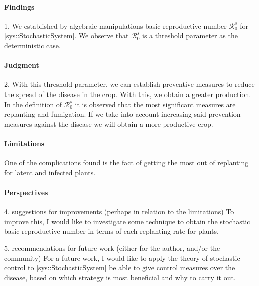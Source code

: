 \paragraph{Findings}
1. We established by algebraic manipulations basic reproductive number
$\mathcal{R}^s_0$ for \autoref{sys::StochasticSystem}. We observe that
$\mathcal{R}^s_0$ is a threshold parameter as the deterministic case.
\paragraph{Judgment}
2. With this threshold parameter, we can establish preventive measures to reduce
the spread of the disease in the crop. With this, we obtain a greater production.
In the definition of $\mathcal{R}^s_0$ it is observed that the most significant
measures are replanting and fumigation. If we take into account increasing said
prevention measures against the disease we will obtain a more productive crop.
\paragraph{Limitations}
One of the complications found is the fact of getting the most out of replanting
for latent and infected plants. 
\paragraph{Perspectives}
4. suggestions for improvements (perhaps in relation to the limitations)
To improve this, I would like to investigate some technique to obtain the
stochastic basic reproductive number in terms of each replanting rate for plants.

5. recommendations for future work (either for the author, and/or the community)
For a future work, I would like to apply the theory of stochastic
control to \autoref{sys::StochasticSystem} be able to give control
measures over the disease, based on which strategy is most beneficial
and why to carry it out.

